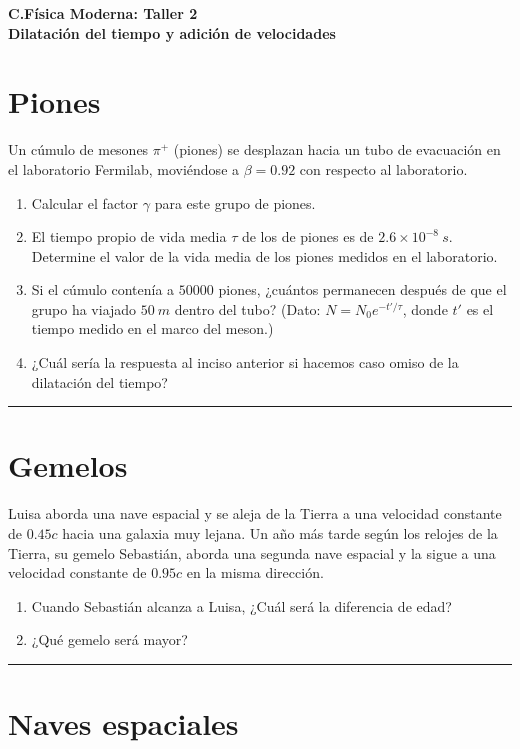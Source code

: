 \documentclass[12pt]{article}
\begin{document}
 
\begin{center}
\Large \textbf{C.Física Moderna: Taller 2}\\
\normalsize \textbf{Dilatación del tiempo y adición de velocidades}
\end{center}
 
  

\section{Piones}
 Un cúmulo de mesones $\pi^+$ (piones) se desplazan hacia un tubo de evacuación en el laboratorio Fermilab, moviéndose a $\beta= 0.92$ con respecto al laboratorio.
 	
 	\begin{enumerate}
 		\item Calcular el factor $\gamma$ para este grupo de piones.
 		\item El tiempo propio de vida media $\tau$ de los de piones es de $2.6\times1 0^{-8}~s$. Determine el valor de la vida media de los piones medidos en el laboratorio.
 		\item Si el cúmulo contenía a $50000$ piones,  ¿cuántos permanecen después de que el grupo ha viajado $50~m$ dentro del tubo? (Dato: $N=N_0e^{-t'/\tau}$, donde $t'$ es el tiempo medido en el marco del meson.)
 		\item ¿Cuál sería la respuesta al inciso anterior si hacemos caso omiso de la dilatación del tiempo?
 	\end{enumerate}
\noindent\rule{16.5cm}{0.4pt}

\section{Gemelos}

Luisa aborda una nave espacial y se aleja de la Tierra a una velocidad constante de $0.45c$ hacia una galaxia muy lejana. Un a\~no m\'as tarde seg\'un los relojes de la Tierra, su gemelo Sebastián, aborda una segunda nave espacial y la sigue a una velocidad constante de $0.95c$ en la misma dirección. 
\begin{enumerate}
	\item Cuando Sebastián alcanza a Luisa, ¿Cuál será la diferencia de edad?
	\item ¿Qué gemelo será mayor?
\end{enumerate}


\noindent\rule{16.5cm}{0.4pt}

\section{Naves espaciales}
\end{document}
